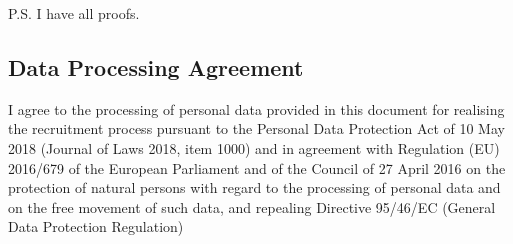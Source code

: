 \documentclass{yb}
\begin{document}



P.S. I have all proofs.

\subsection*{Data Processing Agreement}

I agree to the processing of personal data provided in this document for realising the recruitment process pursuant to the Personal Data Protection Act of 10 May 2018 (Journal of Laws 2018, item 1000) and in agreement with Regulation (EU) 2016/679 of the European Parliament and of the Council of 27 April 2016 on the protection of natural persons with regard to the processing of personal data and on the free movement of such data, and repealing Directive 95/46/EC (General Data Protection Regulation)
\end{document}
